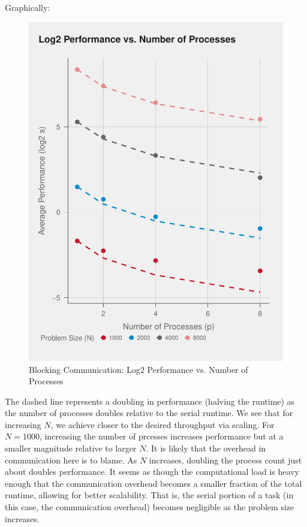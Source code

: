 \documentclass{article}
\begin{document}
\noindent Graphically:
\begin{figure}[H]
   \centering
   \includegraphics[scale=0.7]{../part2/out/np.pdf} 
   \caption{Blocking Communication: Log2 Performance vs. Number of Processes}
\end{figure}
\noindent The dashed line represents a doubling in performance (halving the runtime) 
as the number of processes doubles relative to the serial runtime. We see that 
for increasing $N$, we achieve closer to the desired throughput via scaling. 
For $N = 1000$, increasing the number of prcesses increases performance but at a 
smaller magnitude relative to larger $N$. It is likely that the overhead in 
communication here is to blame. As $N$ increases, doubling the process count 
just about doubles performance. It seems as though the computational load is 
heavy enough that the communication overhead becomes a smaller fraction of 
the total runtime, allowing for better scalability. That is, the serial portion of a task 
(in this case, the communication overhead) becomes negligible as the problem size increases.
\end{document}
